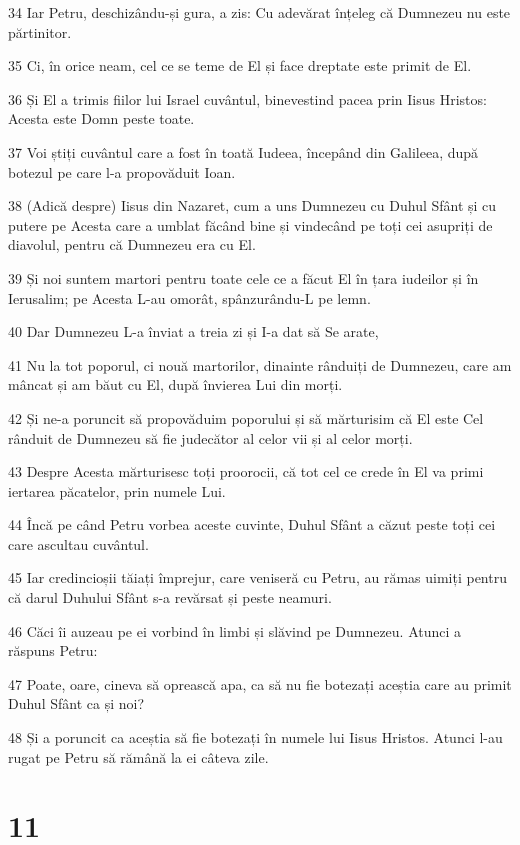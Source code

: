 \par 34 Iar Petru, deschizându-și gura, a zis: Cu adevărat înțeleg că Dumnezeu nu este părtinitor.
\par 35 Ci, în orice neam, cel ce se teme de El și face dreptate este primit de El.
\par 36 Și El a trimis fiilor lui Israel cuvântul, binevestind pacea prin Iisus Hristos: Acesta este Domn peste toate.
\par 37 Voi știți cuvântul care a fost în toată Iudeea, începând din Galileea, după botezul pe care l-a propovăduit Ioan.
\par 38 (Adică despre) Iisus din Nazaret, cum a uns Dumnezeu cu Duhul Sfânt și cu putere pe Acesta care a umblat făcând bine și vindecând pe toți cei asupriți de diavolul, pentru că Dumnezeu era cu El.
\par 39 Și noi suntem martori pentru toate cele ce a făcut El în țara iudeilor și în Ierusalim; pe Acesta L-au omorât, spânzurându-L pe lemn.
\par 40 Dar Dumnezeu L-a înviat a treia zi și I-a dat să Se arate,
\par 41 Nu la tot poporul, ci nouă martorilor, dinainte rânduiți de Dumnezeu, care am mâncat și am băut cu El, după învierea Lui din morți.
\par 42 Și ne-a poruncit să propovăduim poporului și să mărturisim că El este Cel rânduit de Dumnezeu să fie judecător al celor vii și al celor morți.
\par 43 Despre Acesta mărturisesc toți proorocii, că tot cel ce crede în El va primi iertarea păcatelor, prin numele Lui.
\par 44 Încă pe când Petru vorbea aceste cuvinte, Duhul Sfânt a căzut peste toți cei care ascultau cuvântul.
\par 45 Iar credincioșii tăiați împrejur, care veniseră cu Petru, au rămas uimiți pentru că darul Duhului Sfânt s-a revărsat și peste neamuri.
\par 46 Căci îi auzeau pe ei vorbind în limbi și slăvind pe Dumnezeu. Atunci a răspuns Petru:
\par 47 Poate, oare, cineva să oprească apa, ca să nu fie botezați aceștia care au primit Duhul Sfânt ca și noi?
\par 48 Și a poruncit ca aceștia să fie botezați în numele lui Iisus Hristos. Atunci l-au rugat pe Petru să rămână la ei câteva zile.

\chapter{11}


